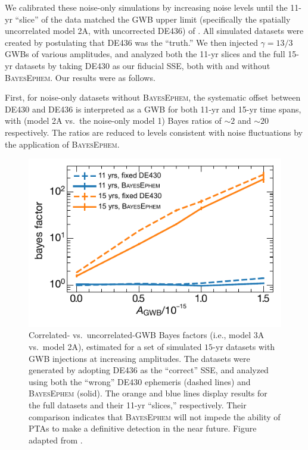 \documentclass{aastex63}
\begin{document}
We calibrated these noise-only simulations by increasing noise levels until the 11-yr ``slice'' of the data matched the GWB upper limit (specifically the spatially uncorrelated model 2A, with uncorrected DE436) of \cite{2018ApJ...859...47A}.
All simulated datasets were created by postulating that DE436 was the ``truth.'' We then injected $\gamma = 13/3$ GWBs of various amplitudes, and analyzed both the 11-yr slices and the full 15-yr datasets by taking DE430 as our fiducial SSE, both with and without \textsc{BayesEphem}.
Our results were as follows.

First, for noise-only datasets without \textsc{BayesEphem}, the systematic offset between DE430 and DE436 is interpreted as a GWB for both 11-yr and 15-yr time spans, with (model 2A vs.\ the noise-only model 1) Bayes ratios of $\sim 2$ and $\sim 20$ respectively. The ratios are reduced to levels consistent with noise fluctuations by the application of \textsc{BayesEphem}.
%
\begin{figure}
    \begin{center}
    \includegraphics{figures/bayesephem_simulations.pdf}
    \caption{Correlated- vs.\ uncorrelated-GWB Bayes factors (i.e., model 3A vs.\ model 2A), estimated for a set of simulated $15$-yr datasets with GWB injections at increasing amplitudes.
    The datasets were generated by adopting DE436 as the ``correct'' SSE, and analyzed using both the ``wrong'' DE430 ephemeris (dashed lines) and \textsc{BayesEphem} (solid). The orange and blue lines display results for the full datasets and their 11-yr ``slices,'' respectively.
    Their comparison indicates that \textsc{BayesEphem} will not impede the ability of PTAs to make a definitive detection in the near future.
    Figure adapted from \cite{2018ApJ...859...47A}.
    \label{fig:simulations}}
    \end{center}
\end{figure}
\end{document}
